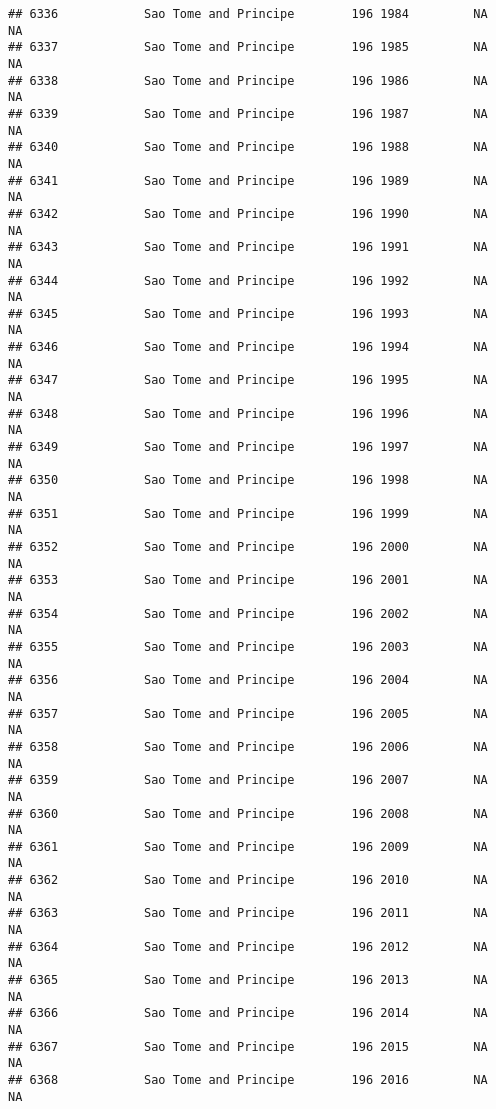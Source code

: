 \documentclass[
]{article}
\begin{document}
\begin{verbatim}
## 6336            Sao Tome and Principe        196 1984         NA         NA
## 6337            Sao Tome and Principe        196 1985         NA         NA
## 6338            Sao Tome and Principe        196 1986         NA         NA
## 6339            Sao Tome and Principe        196 1987         NA         NA
## 6340            Sao Tome and Principe        196 1988         NA         NA
## 6341            Sao Tome and Principe        196 1989         NA         NA
## 6342            Sao Tome and Principe        196 1990         NA         NA
## 6343            Sao Tome and Principe        196 1991         NA         NA
## 6344            Sao Tome and Principe        196 1992         NA         NA
## 6345            Sao Tome and Principe        196 1993         NA         NA
## 6346            Sao Tome and Principe        196 1994         NA         NA
## 6347            Sao Tome and Principe        196 1995         NA         NA
## 6348            Sao Tome and Principe        196 1996         NA         NA
## 6349            Sao Tome and Principe        196 1997         NA         NA
## 6350            Sao Tome and Principe        196 1998         NA         NA
## 6351            Sao Tome and Principe        196 1999         NA         NA
## 6352            Sao Tome and Principe        196 2000         NA         NA
## 6353            Sao Tome and Principe        196 2001         NA         NA
## 6354            Sao Tome and Principe        196 2002         NA         NA
## 6355            Sao Tome and Principe        196 2003         NA         NA
## 6356            Sao Tome and Principe        196 2004         NA         NA
## 6357            Sao Tome and Principe        196 2005         NA         NA
## 6358            Sao Tome and Principe        196 2006         NA         NA
## 6359            Sao Tome and Principe        196 2007         NA         NA
## 6360            Sao Tome and Principe        196 2008         NA         NA
## 6361            Sao Tome and Principe        196 2009         NA         NA
## 6362            Sao Tome and Principe        196 2010         NA         NA
## 6363            Sao Tome and Principe        196 2011         NA         NA
## 6364            Sao Tome and Principe        196 2012         NA         NA
## 6365            Sao Tome and Principe        196 2013         NA         NA
## 6366            Sao Tome and Principe        196 2014         NA         NA
## 6367            Sao Tome and Principe        196 2015         NA         NA
## 6368            Sao Tome and Principe        196 2016         NA         NA

\end{verbatim}
\end{document}
